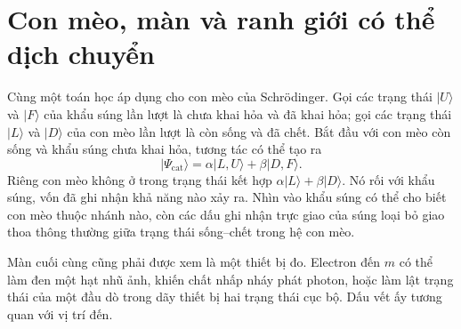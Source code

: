 \section{Con mèo, màn và ranh giới có thể dịch chuyển}

Cùng một toán học áp dụng cho con mèo của Schr\"odinger. Gọi các trạng thái \(|U\rangle\) và \(|F\rangle\) của khẩu súng lần lượt là chưa khai hỏa và đã khai hỏa; gọi các trạng thái \(|L\rangle\) và \(|D\rangle\) của con mèo lần lượt là còn sống và đã chết. Bắt đầu với con mèo còn sống và khẩu súng chưa khai hỏa, tương tác có thể tạo ra
\begin{equation}
|\Psi_{\mathrm{cat}}\rangle
=\alpha|L,U\rangle+\beta|D,F\rangle.
\end{equation}
Riêng con mèo không ở trong trạng thái kết hợp \(\alpha|L\rangle+\beta|D\rangle\). Nó rối với khẩu súng, vốn đã ghi nhận khả năng nào xảy ra. Nhìn vào khẩu súng có thể cho biết con mèo thuộc nhánh nào, còn các dấu ghi nhận trực giao của súng loại bỏ giao thoa thông thường giữa trạng thái sống--chết trong hệ con mèo.

\begin{classroomqa}
\end{classroomqa}

Màn cuối cùng cũng phải được xem là một thiết bị đo. Electron đến \(m\) có thể làm đen một hạt nhũ ảnh, khiến chất nhấp nháy phát photon, hoặc làm lật trạng thái của một đầu dò trong dãy thiết bị hai trạng thái cục bộ. Dấu vết ấy tương quan với vị trí đến.

\begin{classroomqa}
\end{classroomqa}

